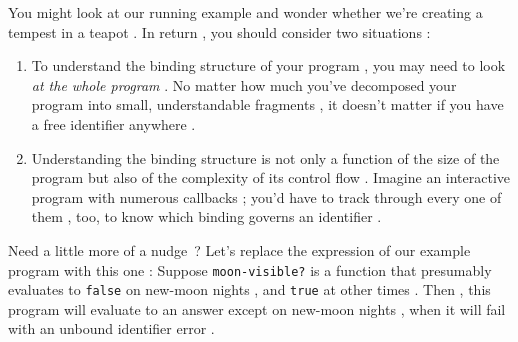 \secdown
{}

You might look at our running example  and wonder whether we’re creating a tempest in a teapot . In return , you
should consider two situations :
\begin{enumerate}

\item To understand the binding structure of your program , you may need to look \emph{at the whole
program} . No
matter how much you’ve decomposed your program  into small, understandable fragments , it doesn’t matter if you have a free identifier anywhere .

\item Understanding the binding structure  is
not only a function of the size of the program  but also of the complexity of its control flow . Imagine an interactive program with numerous callbacks
;
you’d have to track through every one of them , too, to know which
binding governs an identifier .

\end{enumerate}

Need a little more of a nudge \,? Let’s replace the
expression of our example program with this one :
Suppose  \verb|moon-visible?| is a function 
that presumably evaluates to 
\verb|false| on new-moon nights , and  \verb|true| at
other times . Then , this program will evaluate
to an answer  except on new-moon
nights , when it will fail with an unbound
identifier error .

